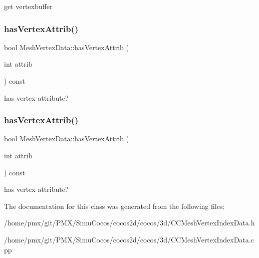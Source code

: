 get vertexbuffer \mbox{\label{classMeshVertexData_a8b2f51bd2ff3d9fab32fd1ec1ab54264}} 
\subsubsection{\texorpdfstring{has\+Vertex\+Attrib()}{hasVertexAttrib()}\hspace{0.1cm}{\footnotesize\ttfamily [1/2]}}
{\footnotesize\ttfamily bool Mesh\+Vertex\+Data\+::has\+Vertex\+Attrib (\begin{DoxyParamCaption}\item[{int}]{attrib }\end{DoxyParamCaption}) const}

has vertex attribute? \mbox{\label{classMeshVertexData_a8b2f51bd2ff3d9fab32fd1ec1ab54264}} 
\subsubsection{\texorpdfstring{has\+Vertex\+Attrib()}{hasVertexAttrib()}\hspace{0.1cm}{\footnotesize\ttfamily [2/2]}}
{\footnotesize\ttfamily bool Mesh\+Vertex\+Data\+::has\+Vertex\+Attrib (\begin{DoxyParamCaption}\item[{int}]{attrib }\end{DoxyParamCaption}) const}

has vertex attribute? 

The documentation for this class was generated from the following files\+:\begin{DoxyCompactItemize}
\item 
/home/pmx/git/\+P\+M\+X/\+Simu\+Cocos/cocos2d/cocos/3d/C\+C\+Mesh\+Vertex\+Index\+Data.\+h\item 
/home/pmx/git/\+P\+M\+X/\+Simu\+Cocos/cocos2d/cocos/3d/C\+C\+Mesh\+Vertex\+Index\+Data.\+cpp\end{DoxyCompactItemize}
